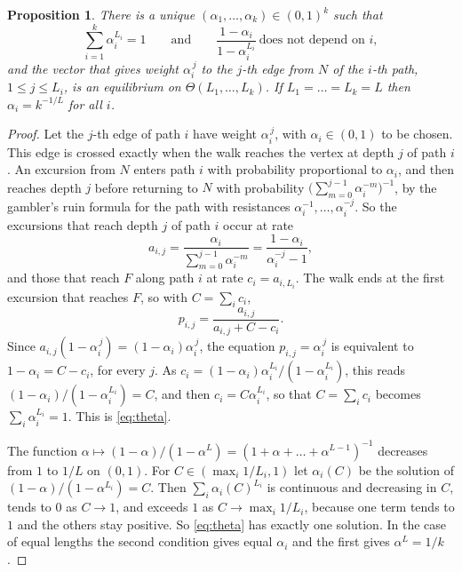 \documentclass[11pt]{amsart}
\newtheorem{proposition}[theorem]{Proposition}
\theoremstyle{remark}
\begin{document}
\begin{proposition}\label{prop:theta}
There is a unique $(\alpha_1,\dots,\alpha_k)\in(0,1)^k$ such that
\begin{equation}\label{eq:theta}
\sum_{i=1}^k\alpha_i^{L_i}=1\qquad\text{and}\qquad\frac{1-\alpha_i}{1-\alpha_i^{L_i}}\ \text{does not depend on }i,
\end{equation}
and the vector that gives weight $\alpha_i^{\,j}$ to the $j$-th edge from $N$ of the $i$-th path, $1\le j\le L_i$, is
an equilibrium on $\Theta(L_1,\dots,L_k)$. If $L_1=\dots=L_k=L$ then $\alpha_i=k^{-1/L}$ for all $i$.
\end{proposition}
\begin{proof}
Let the $j$-th edge of path $i$ have weight $\alpha_i^{\,j}$, with $\alpha_i\in(0,1)$ to be chosen. This edge is
crossed exactly when the walk reaches the vertex at depth $j$ of path $i$. An excursion from $N$ enters path $i$ with
probability proportional to $\alpha_i$, and then reaches depth $j$ before returning to $N$ with probability
$\bigl(\sum_{m=0}^{j-1}\alpha_i^{-m}\bigr)^{-1}$, by the gambler's ruin formula for the path with resistances
$\alpha_i^{-1},\dots,\alpha_i^{-j}$. So the excursions that reach depth $j$ of path $i$ occur at rate
\[
a_{i,j}=\frac{\alpha_i}{\sum_{m=0}^{j-1}\alpha_i^{-m}}=\frac{1-\alpha_i}{\alpha_i^{-j}-1},
\]
and those that reach $F$ along path $i$ at rate $c_i=a_{i,L_i}$. The walk ends at the first excursion that reaches
$F$, so with $C=\sum_ic_i$,
\[
p_{i,j}=\frac{a_{i,j}}{a_{i,j}+C-c_i}.
\]
Since $a_{i,j}(1-\alpha_i^{\,j})=(1-\alpha_i)\alpha_i^{\,j}$, the equation $p_{i,j}=\alpha_i^{\,j}$ is equivalent to
$1-\alpha_i=C-c_i$, for every $j$. As $c_i=(1-\alpha_i)\alpha_i^{L_i}/(1-\alpha_i^{L_i})$, this reads
$(1-\alpha_i)/(1-\alpha_i^{L_i})=C$, and then $c_i=C\alpha_i^{L_i}$, so that $C=\sum_ic_i$ becomes
$\sum_i\alpha_i^{L_i}=1$. This is \eqref{eq:theta}.

The function $\alpha\mapsto(1-\alpha)/(1-\alpha^{L})=(1+\alpha+\dots+\alpha^{L-1})^{-1}$ decreases from $1$ to $1/L$
on $(0,1)$. For $C\in(\max_i1/L_i,1)$ let $\alpha_i(C)$ be the solution of $(1-\alpha)/(1-\alpha^{L_i})=C$. Then
$\sum_i\alpha_i(C)^{L_i}$ is continuous and decreasing in $C$, tends to $0$ as $C\to1$, and exceeds $1$ as
$C\to\max_i1/L_i$, because one term tends to $1$ and the others stay positive. So \eqref{eq:theta} has exactly one
solution. In the case of equal lengths the second condition gives equal $\alpha_i$ and the first gives
$\alpha^L=1/k$.
\end{proof}
\end{document}
